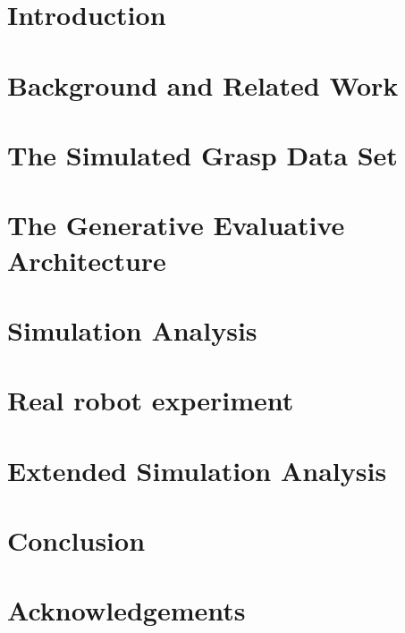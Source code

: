 \documentclass{ws-ijhr}
\begin{document}
\section{Introduction}



\section{Background and Related Work}



\section{The Simulated Grasp Data Set}
\label{section:simulation}


\section{The Generative Evaluative Architecture} \label{section:evaluative}


\section{Simulation Analysis}
\label{section:simulationAnalysis}


\section{Real robot experiment}
\label{section:experiments}


\section{Extended Simulation Analysis}
\label{section:extendedSimulationAnalysis}


\section{Conclusion} 
\label{sec:conclusion}


\section*{Acknowledgements}
\end{document}

